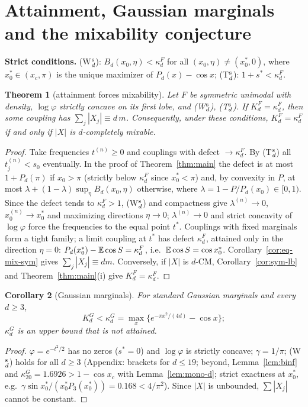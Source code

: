 \documentclass[11pt]{amsart}
\newtheorem{theorem}{Theorem}[section]\newtheorem{proposition}[theorem]{Proposition}\newtheorem{lemma}[theorem]{Lemma}
\newtheorem{corollary}[theorem]{Corollary}\newtheorem{conjecture}[theorem]{Conjecture}
\theoremstyle{definition}\newtheorem{definition}[theorem]{Definition}\theoremstyle{remark}\newtheorem{remark}[theorem]{Remark}
\begin{document}
\section{Attainment, Gaussian marginals and the mixability conjecture}\label{sec:att}
\noindent\textbf{Strict conditions.} (W$_d^{\rm s}$): $B_d(x_0,\eta)<\kappa_d^F$ for all $(x_0,\eta)\ne(x_0^*,0)$, where $x_0^*\in(x_c,\pi)$ is the unique maximizer of $P_d(x)-\cos x$;
(T$_d^{\rm s}$): $1+s^*<\kappa_d^F$.
\begin{theorem}[attainment forces mixability]\label{thm:att}
Let $F$ be symmetric unimodal with density, $\log\varphi$ strictly concave on its first lobe, and (W$_d^{\rm s}$), (T$_d^{\rm s}$). If $K_d^F=\kappa_d^F$, then some coupling has
$\sum_j|X_j|\equiv d\,m$. Consequently, under these conditions, $K_d^F=\kappa_d^F$ if and only if $|X|$ is $d$-completely mixable.
\end{theorem}
\begin{proof}Take frequencies $t^{(n)}\ge0$ and couplings with defect $\to\kappa_d^F$. By (T$_d^{\rm s}$) all $t_j^{(n)}<s_0$ eventually. In the proof of Theorem~\ref{thm:main} the defect is at
most $1+P_d(\pi)$ if $x_0>\pi$ (strictly below $\kappa_d^F$ since $x_0^*<\pi$) and, by convexity in $P$, at most $\lambda+(1-\lambda)\sup_\eta B_d(x_0,\eta)$ otherwise, where
$\lambda=1-P/P_d(x_0)\in[0,1)$. Since the defect tends to $\kappa_d^F>1$, (W$_d^{\rm s}$) and compactness give $\lambda^{(n)}\to0$, $x_0^{(n)}\to x_0^*$ and maximizing directions $\eta\to0$;
$\lambda^{(n)}\to0$ and strict concavity of $\log\varphi$ force the frequencies to the equal point $t^*$. Couplings with fixed
marginals form a tight family; a limit coupling at $t^*$ has defect $\kappa_d^F$, attained only in the direction $\eta=0$: $P_d(x_0^*)-\mathbb E\cos S=\kappa_d^F$, i.e.\ $\mathbb E\cos S=\cos x_0^*$.
Corollary~\ref{cor:eq-mix-sym} gives $\sum_j|X_j|\equiv dm$. Conversely, if $|X|$ is $d$-CM, Corollary~\ref{cor:sym-lb} and Theorem~\ref{thm:main}(i) give $K_d^F=\kappa_d^F$.\end{proof}
\begin{corollary}[Gaussian marginals]\label{cor:gauss}
For standard Gaussian marginals and every $d\ge3$,
\[K_d^G<\kappa_d^G=\max_x\{e^{-\pi x^2/(4d)}-\cos x\};\]
$\kappa_d^G$ is an upper bound that is not attained.
\end{corollary}
\begin{proof}$\varphi=e^{-t^2/2}$ has no zeros ($s^*=0$) and $\log\varphi$ is strictly concave; $\gamma=1/\pi$; (W$_d^{\rm s}$) holds for all $d\ge3$ (Appendix: brackets for $d\le19$; beyond, Lemma~\ref{lem:binf} and
$\kappa_{20}^G=1.6926>1-\cos x_c$ with Lemma~\ref{lem:mono-d}; strict exactness at $x_0^*$, e.g.\ $\gamma\sin x_0^*/(x_0^*P_3(x_0^*))=0.168<4/\pi^2$). Since $|X|$ is unbounded, $\sum|X_j|$ cannot be constant.\end{proof}
\end{document}
